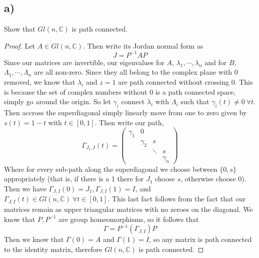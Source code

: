\documentclass{article}
\theoremstyle{definition}
\begin{document}
\subsection*{a)}
\begin{mdframed}[]
    Show that $Gl(n,\mathbb{C})$ is path connected.
\end{mdframed}
\begin{proof}
    Let $A \in Gl(n,\mathbb{C})$. Then write its Jordan normal form as 
    \[
        J = P^{-1}AP
    \]
    Since our matrices are invertible, our eigenvalues for $A$, $\lambda_1, \cdots ,\lambda_n$ and for 
    $B$, $\Lambda_1, \cdots, \Lambda_n$ are all non-zero. Since they all belong to the complex plane with 0
    removed, we know that $\lambda_i$ and $z = 1$ are path connected without crossing $0$. This is because 
    the set of complex numbers without 0 is a path connected space, simply go around the origin. So let 
    $\gamma_i$ connect $\lambda_i$ with $\Lambda_i$ such that $\gamma_i(t) \neq 0 \ \forall t$. Then 
    accross the superdiagonal simply linearly move from one to zero given by $s(t) = 1-t$ with $t \in [0,1]$.
    Then write our path,
    \[
        \Gamma_{J_1,I}(t) = \begin{pmatrix}
            \gamma_1 & 0 \\
            & \gamma_2 & s \\
            & & \ddots & s \\
            & & & \gamma_n 
        \end{pmatrix}
    \]
    Where for every sub-path along the superdiagonal we choose between $\{0,s\}$ appropriately (that is, if there is a 1 there for $J_1$ choose $s$, otherwise choose 0).
     Then we have 
    $\Gamma_{J,I}(0) = J_1, \Gamma_{J,I}(1) = I$, and $\Gamma_{J,I}(t) \in Gl(n, \mathbb{C}) \ \forall t \in [0,1]$. This last 
    fact follows from the fact that our matrices remain as upper triangular matrices with no zeroes on the diagonal.
    We know that $P,P^{-1}$ are group homeomorphisms, so it follows that 
    \[
        \Gamma = P^{-1}(\Gamma_{J,I})P
    \]
    Then we know that $\Gamma(0) = A$ and $\Gamma(1) = I$, so any matrix is path connected to the identity matrix,
    therefore $Gl(n,\mathbb{C})$ is path connected.
\end{proof}
\end{document}
